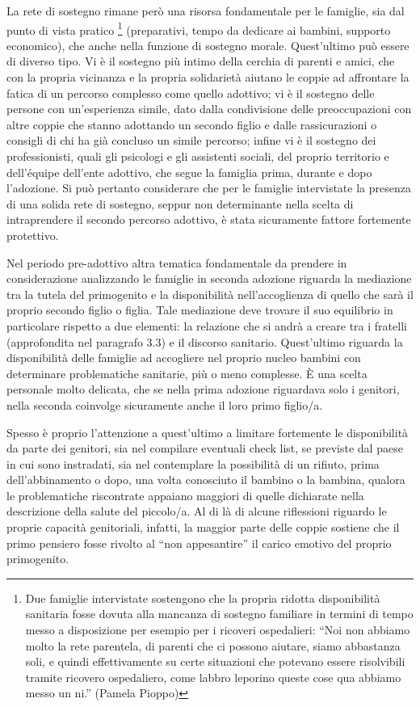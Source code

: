 \documentclass[12pt,oneside,svgnames]{memoir}
\begin{document}
La rete di sostegno rimane però una risorsa fondamentale per le
famiglie, sia dal punto di vista pratico \footnote{Due famiglie
  intervistate sostengono che la propria ridotta disponibilità sanitaria
  fosse dovuta alla mancanza di sostegno familiare in termini di tempo
  messo a disposizione per esempio per i ricoveri ospedalieri: ``Noi non
  abbiamo molto la rete parentela, di parenti che ci possono aiutare,
  siamo abbastanza soli, e quindi effettivamente su certe situazioni che
  potevano essere risolvibili tramite ricovero ospedaliero, come labbro
  leporino queste cose qua abbiamo messo un ni.'' (Pamela Pioppo)}
(preparativi, tempo da dedicare ai bambini, supporto economico), che
anche nella funzione di sostegno morale. Quest'ultimo può essere di
diverso tipo. Vi è il sostegno più intimo della cerchia di parenti e
amici, che con la propria vicinanza e la propria solidarietà aiutano le
coppie ad affrontare la fatica di un percorso complesso come quello
adottivo; vi è il sostegno delle persone con un'esperienza simile, dato
dalla condivisione delle preoccupazioni con altre coppie che stanno
adottando un secondo figlio e dalle rassicurazioni o consigli di chi ha
già concluso un simile percorso; infine vi è il sostegno dei
professionisti, quali gli psicologi e gli assistenti sociali, del
proprio territorio e dell'équipe dell'ente adottivo, che segue la
famiglia prima, durante e dopo l'adozione. Si può pertanto considerare
che per le famiglie intervistate la presenza di una solida rete di
sostegno, seppur non determinante nella scelta di intraprendere il
secondo percorso adottivo, è stata sicuramente fattore fortemente
protettivo.

Nel periodo pre-adottivo altra tematica fondamentale da prendere in
considerazione analizzando le famiglie in seconda adozione riguarda la
mediazione tra la tutela del primogenito e la disponibilità
nell'accoglienza di quello che sarà il proprio secondo figlio o figlia.
Tale mediazione deve trovare il suo equilibrio in particolare rispetto a
due elementi: la relazione che si andrà a creare tra i fratelli
(approfondita nel paragrafo 3.3) e il discorso sanitario. Quest'ultimo
riguarda la disponibilità delle famiglie ad accogliere nel proprio
nucleo bambini con determinare problematiche sanitarie, più o meno
complesse. È una scelta personale molto delicata, che se nella prima
adozione riguardava solo i genitori, nella seconda coinvolge sicuramente
anche il loro primo figlio/a.

Spesso è proprio l'attenzione a quest'ultimo a limitare fortemente le
disponibilità da parte dei genitori, sia nel compilare eventuali check
list, se previste dal paese in cui sono instradati, sia nel contemplare
la possibilità di un rifiuto, prima dell'abbinamento o dopo, una volta
conosciuto il bambino o la bambina, qualora le problematiche riscontrate
appaiano maggiori di quelle dichiarate nella descrizione della salute
del piccolo/a. Al di là di alcune riflessioni riguardo le proprie
capacità genitoriali, infatti, la maggior parte delle coppie sostiene
che il primo pensiero fosse rivolto al ``non appesantire'' il carico
emotivo del proprio primogenito.
\end{document}
